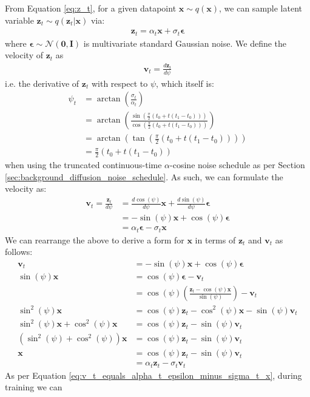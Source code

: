\documentclass[ oneside,%
                    author={George Herbert},
                    degree={MSci},
                     title={Video Diffusion Models for Climate Simulations},
                  subtitle={}]{dissertation}
\begin{document}
From Equation \ref{eq:z_t}, for a given datapoint $\mathbf{x}\sim q(\mathbf{x})$, we can sample latent variable $\mathbf{z}_t\sim q(\mathbf{z}_t|\mathbf{x})$ via:
\begin{align}
      \mathbf{z}_t=\alpha_t\mathbf{x}+\sigma_t\boldsymbol\epsilon
\end{align}
where $\boldsymbol\epsilon\sim\mathcal{N}(\mathbf{0},\mathbf{I})$ is multivariate standard Gaussian noise. We define the velocity of $\mathbf{z}_t$ as
\begin{align}
      \mathbf{v}_t=\frac{d\mathbf{z}_t}{d \psi}
\end{align}
i.e. the derivative of $\mathbf{z}_t$ with respect to $\psi$, which itself is:
\begin{align}
      \psi_t&=\arctan\left(\frac{\sigma_t}{\alpha_t}\right)\\
      &=\arctan\left(\frac{\sin\left(\frac{\pi}{2}(t_0+t(t_1-t_0))\right)}{\cos\left(\frac{\pi}{2}(t_0+t(t_1-t_0))\right)}
      \right)\\
      &=\arctan\left(\tan\left(\frac{\pi}{2}(t_0+t(t_1-t_0))\right)\right)\\
      &=\frac{\pi}{2}(t_0+t(t_1-t_0))
\end{align}
when using the truncated continuous-time $\alpha$-cosine noise schedule as per Section \ref{sec:background_diffusion_noise_schedule}. As such, we can formulate the velocity as:
\begin{align}
      \mathbf{v}_t=\frac{\mathbf{z}_t}{d\psi}&=\frac{d\cos(\psi)}{d\psi}\mathbf{x}+\frac{d\sin(\psi)}{d\psi}\boldsymbol\epsilon\\
      &=-\sin(\psi)\mathbf{x}+\cos(\psi)\boldsymbol\epsilon\\
      &=\alpha_t\boldsymbol\epsilon-\sigma_t\mathbf{x}\label{eq:v_t_equals_alpha_t_epsilon_minus_sigma_t_x}
\end{align}
We can rearrange the above to derive a form for $\mathbf{x}$ in terms of $\mathbf{z}_t$ and $\mathbf{v}_t$ as follows:
\begin{align}
      \mathbf{v}_t&=-\sin(\psi)\mathbf{x}+\cos(\psi)\boldsymbol\epsilon\\
      \sin(\psi)\mathbf{x}&=\cos(\psi)\boldsymbol\epsilon-\mathbf{v}_t\\
      &=\cos(\psi)\left(\frac{\mathbf{z}_t-\cos(\psi)\mathbf{x}}{\sin(\psi)}\right)-\mathbf{v}_t\\
      \sin^2(\psi)\mathbf{x}&=\cos(\psi)\mathbf{z}_t-\cos^2(\psi)\mathbf{x}-\sin(\psi)\mathbf{v}_t\\
      \sin^2(\psi)\mathbf{x}+\cos^2(\psi)\mathbf{x}&=\cos(\psi)\mathbf{z}_t-\sin(\psi)\mathbf{v}_t\\
      (\sin^2(\psi)+\cos^2(\psi))\mathbf{x}&=\cos(\psi)\mathbf{z}_t-\sin(\psi)\mathbf{v}_t\\
      \mathbf{x}&=\cos(\psi)\mathbf{z}_t-\sin(\psi)\mathbf{v}_t\\
      &=\alpha_t\mathbf{z}_t-\sigma_t\mathbf{v}_t
\end{align}
As per Equation \ref{eq:v_t_equals_alpha_t_epsilon_minus_sigma_t_x}, during training we can 
\end{document}
